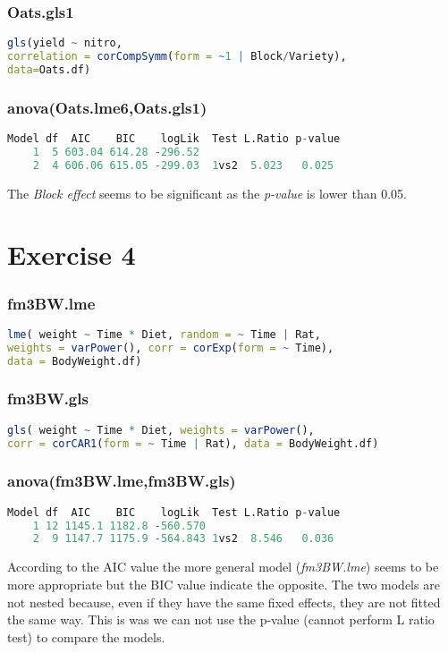 \documentclass[a4paper,12pt]{article}
\begin{document}
	\subsubsection*{Oats.gls1}
	\begin{lstlisting}[language=R]
gls(yield ~ nitro,
correlation = corCompSymm(form = ~1 | Block/Variety),
data=Oats.df)
	\end{lstlisting}
	
	\subsubsection*{anova(Oats.lme6,Oats.gls1)}
	\begin{lstlisting}[language=R]
Model df  AIC    BIC    logLik  Test L.Ratio p-value
    1  5 603.04 614.28 -296.52                        
    2  4 606.06 615.05 -299.03  1vs2  5.023   0.025
	\end{lstlisting}
	The \textit{Block effect} seems to be significant as the \textit{p-value} is lower than 0.05.
	
	\newpage
	\section{Exercise 4}

	\subsubsection*{fm3BW.lme}
	\begin{lstlisting}[language=R]
lme( weight ~ Time * Diet, random = ~ Time | Rat,
weights = varPower(), corr = corExp(form = ~ Time),
data = BodyWeight.df)
	\end{lstlisting}
	
	\subsubsection*{fm3BW.gls}
	\begin{lstlisting}[language=R]
gls( weight ~ Time * Diet, weights = varPower(),
corr = corCAR1(form = ~ Time | Rat), data = BodyWeight.df)
	\end{lstlisting}

	\subsubsection*{anova(fm3BW.lme,fm3BW.gls)}
	\begin{lstlisting}[language=R]
Model df  AIC    BIC    logLik  Test L.Ratio p-value
    1 12 1145.1 1182.8 -560.570                        
    2  9 1147.7 1175.9 -564.843 1vs2  8.546   0.036
	\end{lstlisting}
	According to the AIC value the more general model (\textit{fm3BW.lme}) seems to be more appropriate but the BIC value indicate the opposite. The two models are not nested because, even if they have the same fixed effects, they are not fitted the same way. This is was we can not use the p-value (cannot perform L ratio test) to compare the models.
	
	
\end{document}
